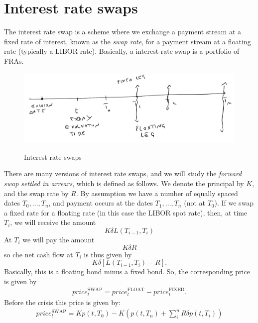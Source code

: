 \section{Interest rate swaps} %
The interest rate swap is a scheme where we exchange a payment stream at a fixed rate of interest, known as the \emph{swap rate}, for a payment stream at a floating rate (typically a LIBOR rate). Basically, a interest rate swap is a portfolio of FRAs.
\begin{figure}[h]
    \centering
    \includegraphics[scale=0.22]{fig/tmp/fig41}
    \label{fig:swap}
    \caption{Interest rate swaps}
\end{figure}
There are many versions of interest rate swaps, and we will study the \emph{forward swap settled in arrears}, which is defined as follows. We denote the principal by $K$, and the swap rate by $R$. By assumption we have a number of equally spaced dates $T_0,\dots,T_n$, and payment occurs at the dates $T_1,\dots,T_n$ (not at $T_0$). If we swap a fixed rate for a floating rate (in this case the LIBOR spot rate), then, at time $T_i$, we will receive the amount
\begin{equation*}
    K\delta L(T_{i-1},T_i)
\end{equation*}
At $T_i$ we will pay the amount
\begin{equation*}
    K\delta R
\end{equation*}
so che net cash flow at $T_i$ is thus given by
\begin{equation}
    K\delta [L(T_{i-1}, T_i) - R].
\end{equation}
Basically, this is a floating bond minus a fixed bond. So, the corresponding price is given by
\begin{align*}
    price_t^{\text{SWAP}} = price_t^{\text{FLOAT}} - price_t^{\text{FIXED}}.
\end{align*}
Before the crisis this price is given by:
\begin{align}
    price_t^{\text{SWAP}} = Kp(t,T_0) - K\left(p(t,T_n) + \sum_i^n R\delta p(t,T_i)\right)
\end{align}
